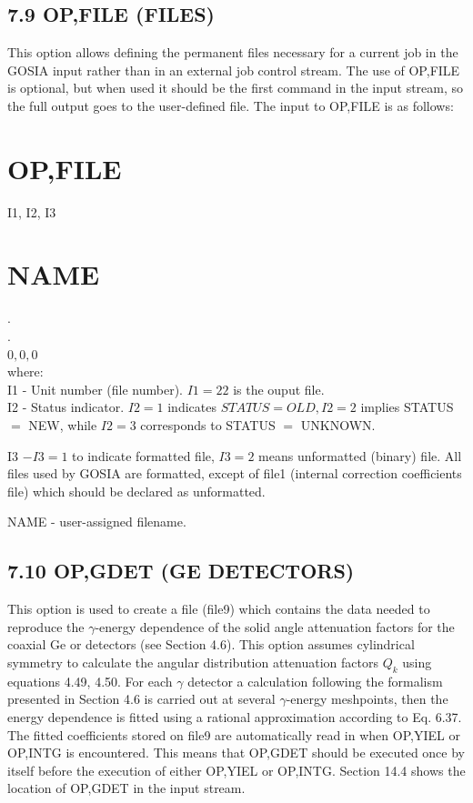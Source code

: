 \documentclass[10pt]{article}
\begin{document}
\subsection*{7.9 OP,FILE (FILES)}
This option allows defining the permanent files necessary for a current job in the GOSIA input rather than in an external job control stream. The use of OP,FILE is optional, but when used it should be the first command in the input stream, so the full output goes to the user-defined file. The input to OP,FILE is as follows:

\section*{OP,FILE}
I1, I2, I3

\section*{NAME}
.\\
.\\
$0,0,0$\\
where:\\
I1 - Unit number (file number). $I 1=22$ is the ouput file.\\
I2 - Status indicator. $I 2=1$ indicates $S T A T U S=O L D, I 2=2$ implies STATUS $=$ NEW, while $I 2=3$ corresponds to STATUS $=$ UNKNOWN.

I3 $-I 3=1$ to indicate formatted file, $I 3=2$ means unformatted (binary) file. All files used by GOSIA are formatted, except of file1 (internal correction coefficients file) which should be declared as unformatted.

NAME - user-assigned filename.

\subsection*{7.10 OP,GDET (GE DETECTORS)}
This option is used to create a file (file9) which contains the data needed to reproduce the $\gamma$-energy dependence of the solid angle attenuation factors for the coaxial Ge or detectors (see Section 4.6). This option assumes cylindrical symmetry to calculate the angular distribution attenuation factors $Q_{k}$ using equations 4.49, 4.50. For each $\gamma$ detector a calculation following the formalism presented in Section 4.6 is carried out at several $\gamma$-energy meshpoints, then the energy dependence is fitted using a rational approximation according to Eq. 6.37. The fitted coefficients stored on file9 are automatically read in when OP,YIEL or OP,INTG is encountered. This means that OP,GDET should be executed once by itself before the execution of either OP,YIEL or OP,INTG. Section 14.4 shows the location of OP,GDET in the input stream.
\end{document}
